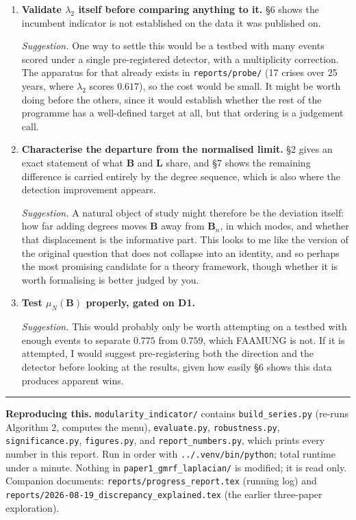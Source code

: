 \documentclass[11pt,a4paper]{article}
\newcommand{\Lap}{\mathbf{L}}
\newcommand{\Bmat}{\mathbf{B}}
\newcommand{\Bn}{\Bmat_{n}}
\begin{document}
\begin{enumerate}[label=\textbf{D\arabic*.}]
\item \textbf{Validate $\lambda_2$ itself before comparing anything to it.} \S6
shows the incumbent indicator is not established on the data it was published on.

\emph{Suggestion.} One way to settle this would be a testbed with many events
scored under a single pre-registered detector, with a multiplicity correction. The
apparatus for that already exists in \texttt{reports/probe/} (17 crises over 25
years, where $\lambda_2$ scores $0.617$), so the cost would be small. It might be
worth doing before the others, since it would establish whether the rest of the
programme has a well-defined target at all, but that ordering is a judgement call.

\item \textbf{Characterise the departure from the normalised limit.} \S2 gives an
exact statement of what $\Bmat$ and $\Lap$ share, and \S7 shows the remaining
difference is carried entirely by the degree sequence, which is also where the
detection improvement appears.

\emph{Suggestion.} A natural object of study might therefore be the deviation
itself: how far adding degrees moves $\Bmat$ away from $\Bn$, in which modes, and
whether that displacement is the informative part. This looks to me like the
version of the original question that does not collapse into an identity, and so
perhaps the most promising candidate for a theory framework, though whether it is
worth formalising is better judged by you.

\item \textbf{Test $\mu_N(\Bmat)$ properly, gated on D1.}

\emph{Suggestion.} This would probably only be worth attempting on a testbed with
enough events to separate $0.775$ from $0.759$, which FAAMUNG is not. If it is
attempted, I would suggest pre-registering both the direction and the detector
before looking at the results, given how easily \S6 shows this data produces
apparent wins.
\end{enumerate}

\vspace{3mm}
\hrule
\vspace{2mm}
{\footnotesize
\textbf{Reproducing this.} \texttt{modularity\_indicator/} contains
\texttt{build\_series.py} (re-runs Algorithm 2, computes the menu),
\texttt{evaluate.py}, \texttt{robustness.py}, \texttt{significance.py},
\texttt{figures.py}, and \texttt{report\_numbers.py}, which prints every number in
this report. Run in order with \texttt{../.venv/bin/python}; total runtime under a
minute. Nothing in \texttt{paper1\_gmrf\_laplacian/} is modified; it is read only.
Companion documents: \texttt{reports/progress\_report.tex} (running log) and
\texttt{reports/2026-08-19\_discrepancy\_explained.tex} (the earlier
three-paper exploration).
\par}
\end{document}

